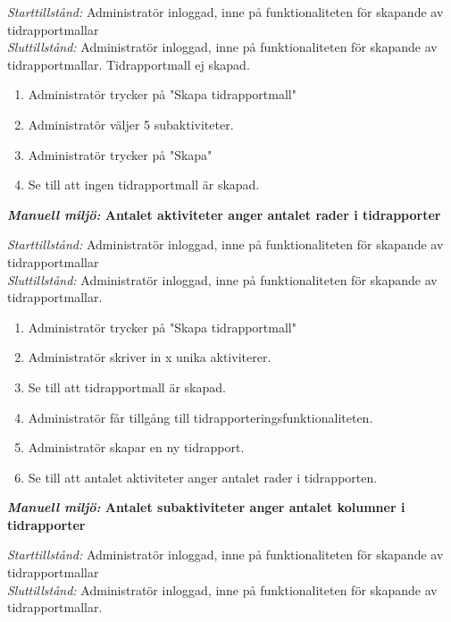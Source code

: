 \documentclass[a4paper]{article}
\begin{document}
\begin{FT}
\emph{Starttillstånd:} Administratör inloggad, inne på funktionaliteten för skapande av tidrapportmallar\\
\emph{Sluttillstånd:} Administratör inloggad, inne på funktionaliteten för skapande av tidrapportmallar. Tidrapportmall ej skapad.\\

\begin{enumerate}
\item Administratör trycker på "Skapa tidrapportmall"
\item Administratör väljer 5 subaktiviteter.
\item Administratör trycker på "Skapa"
\item Se till att ingen tidrapportmall är skapad.
\end{enumerate}


\item
\textbf{\emph{Manuell miljö:} Antalet aktiviteter anger antalet rader i tidrapporter}

\emph{Starttillstånd:} Administratör inloggad, inne på funktionaliteten för skapande av tidrapportmallar\\
\emph{Sluttillstånd:} Administratör inloggad, inne på funktionaliteten för skapande av tidrapportmallar.\\

\begin{enumerate}
\item Administratör trycker på "Skapa tidrapportmall"
\item Administratör skriver in x unika aktiviterer.
\item Se till att tidrapportmall är skapad.
\item Administratör får tillgång till tidrapporteringsfunktionaliteten.
\item Administratör skapar en ny tidrapport.
\item Se till att antalet aktiviteter anger antalet rader i tidrapporten.
\end{enumerate}

\item
\textbf{\emph{Manuell miljö:} Antalet subaktiviteter anger antalet kolumner i tidrapporter}

\emph{Starttillstånd:} Administratör inloggad, inne på funktionaliteten för skapande av tidrapportmallar\\
\emph{Sluttillstånd:} Administratör inloggad, inne på funktionaliteten för skapande av tidrapportmallar.\\


\end{FT}
\end{document}
